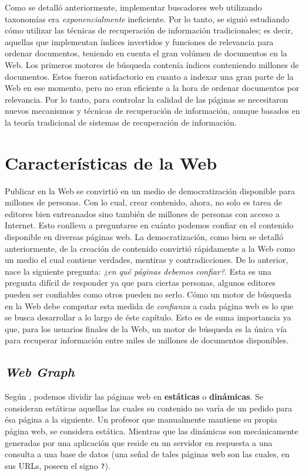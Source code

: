 	Como se detalló anteriormente, implementar buscadores web utilizando taxonomías era \textit{exponencialmente} ineficiente. Por lo tanto, se siguió estudiando cómo utilizar las técnicas de recuperación de información tradicionales; es decir, aquellas que implementan índices invertidos y funciones de relevancia para ordenar documentos, teniendo en cuenta el gran volúmen de documentos en la Web. Los primeros motores de búsqueda contenía índices conteniendo millones de documentos. Estos fueron satisfactorio en cuanto a indexar una gran parte de la Web en ese momento, pero no eran eficiente a la hora de ordenar documentos por relevancia. Por lo tanto, para controlar la calidad de las páginas se necesitaron nuevos mecanismos y técnicas de recuperación de información, aunque basados en la teoría tradicional de sistemas de recuperación de información.
	
\section{Características de la Web}
	Publicar en la Web se convirtió en un medio de democratización disponible para millones de personas. Con lo cual, crear contenido, ahora, no solo es tarea de editores bien entreanados sino también de millones de personas con acceso a Internet. Esto conlleva a preguntarse en cuánto podemos confiar en el contenido disponible en diversas páginas web. La democratización, como bien se detalló anteriormente, de la creación de contenido convirtió rápidamente a la Web como un medio el cual contiene verdades, mentiras y contradicciones. De lo anterior, nace la siguiente pregunta: \textit{¿en qué páginas debemos confiar?}. Esta es una pregunta difícil de responder ya que para ciertas personas, algunos editores pueden ser confiables como otros pueden no serlo. Cómo un motor de búsqueda en la Web debe computar esta medida de \textit{confianza} a cada página web es lo que se busca desarrollar a lo largo de éste capítulo. Esto es de suma importancia ya que, para los usuarios finales de la Web, un motor de búsqueda es la única vía para recuperar información entre miles de millones de documentos disponibles.
	
\subsection{\textit{Web Graph}}
	Según \cite{manning2009}, podemos dividir las páginas web en \textbf{estáticas} o \textbf{dinámicas}. Se consideran estáticas aquellas las cuales su contenido no varía de un pedido para ésa página a la siguiente. Un profesor que manualmente mantiene su propia página web, se considera estática. Mientras que las dinámicas son mecánicamente generadas por una aplicación que reside en un servidor en respuesta a una consulta a una base de datos (una señal de tales páginas web son las cuales, en sus URLs, poseen el signo \texttt{?}). \par
	
